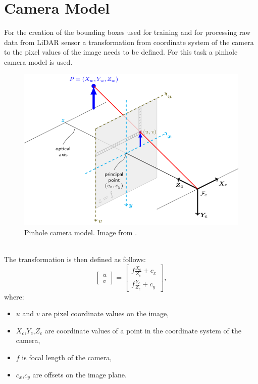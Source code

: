 \documentclass[twoside]{ctuthesis}
\theoremstyle{plain}
\theoremstyle{definition}
\theoremstyle{note}
\begin{document}
\section{Camera Model} \label{sec:camera-model}
For the creation of the bounding boxes used for training and for processing raw data from LiDAR sensor a transformation from coordinate system of the camera to the pixel values of the image needs to be defined. For this task a pinhole camera model is used.
\begin{figure}[h]
	\centering
	\includegraphics[width=\textwidth]{pinhole_camera_model.png}
	\caption{Pinhole camera model. Image from \cite{opencv}.}
\end{figure}\\
The transformation is then defined as follows:
\begin{equation} \label{eq:2}
	\begin{bmatrix}
		u\\
		v
	\end{bmatrix}=
	\begin{bmatrix}
		f\frac{X_c}{Z_c}+c_x\\
		f\frac{Y_c}{Z_c}+c_y
	\end{bmatrix},
\end{equation}
where:
\begin{itemize}
	\item $u$ and $v$ are pixel coordinate values on the image,
	\item $X_c$,$Y_c$,$Z_c$ are coordinate values of a point in the coordinate system of the camera,
	\item $f$ is focal length of the camera,
	\item $c_x$,$c_y$ are offsets on the image plane.
\end{itemize}
\end{document}
